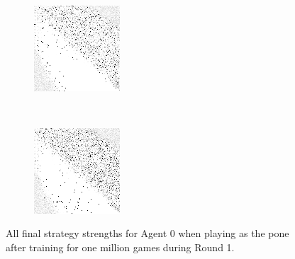 \begin{figure}
\begin{subfigure}[t]{0.22\textwidth}
		\caption{\peggingmaxavggained}
	\end{subfigure}
~
	\begin{subfigure}[t]{0.22\textwidth}
		\includegraphics[width=\textwidth]{images/findings/round1/strategies_peggingmaxmedgained_pone.png}
		\caption{\peggingmaxmedgained}
	\end{subfigure}
	~
	\begin{subfigure}[t]{0.22\textwidth}
		\includegraphics[width=\textwidth]{images/findings/round1/strategies_peggingminavggiven_pone.png}
		\caption{\peggingminavggiven}
	\end{subfigure}

\caption{
	All final strategy strengths for Agent 0
	when playing as the pone
	after training for one million games during Round 1.
}
\label{fig_r1-strats}
\end{figure}

